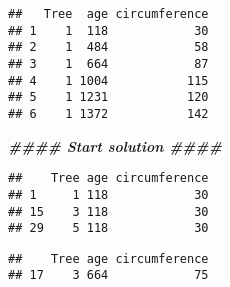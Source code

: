 \documentclass[
]{article}
\newenvironment{Shaded}{\begin{snugshade}}{\end{snugshade}}
\newcommand{\AttributeTok}[1]{\textcolor[rgb]{0.77,0.63,0.00}{#1}}
\newcommand{\CommentTok}[1]{\textcolor[rgb]{0.56,0.35,0.01}{\textit{#1}}}
\newcommand{\DocumentationTok}[1]{\textcolor[rgb]{0.56,0.35,0.01}{\textbf{\textit{#1}}}}
\newcommand{\FunctionTok}[1]{\textcolor[rgb]{0.00,0.00,0.00}{#1}}
\newcommand{\NormalTok}[1]{#1}
\newcommand{\OtherTok}[1]{\textcolor[rgb]{0.56,0.35,0.01}{#1}}
\newcommand{\SpecialCharTok}[1]{\textcolor[rgb]{0.00,0.00,0.00}{#1}}
\newcommand{\StringTok}[1]{\textcolor[rgb]{0.31,0.60,0.02}{#1}}
\begin{document}
\begin{verbatim}
##   Tree  age circumference
## 1    1  118            30
## 2    1  484            58
## 3    1  664            87
## 4    1 1004           115
## 5    1 1231           120
## 6    1 1372           142
\end{verbatim}

\begin{Shaded}
\begin{Highlighting}[]
\DocumentationTok{\#\#\#\# Start solution \#\#\#\#}
\end{Highlighting}
\end{Shaded}

\begin{Shaded}
\end{Shaded}

\begin{verbatim}
##    Tree age circumference
## 1     1 118            30
## 15    3 118            30
## 29    5 118            30
\end{verbatim}

\begin{Shaded}
\end{Shaded}

\begin{verbatim}
##    Tree age circumference
## 17    3 664            75
\end{verbatim}

\begin{Shaded}
\end{Shaded}
\end{document}
